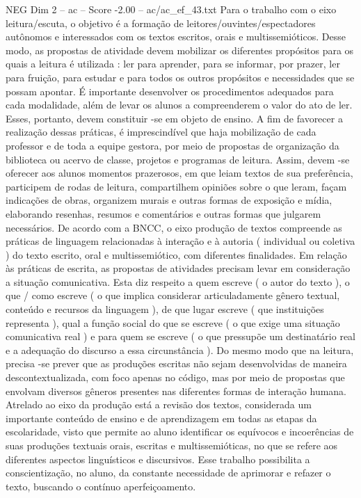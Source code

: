 \begin{textsample}{NEG Dim 2 – ac – Score -2.00 – ac/ac\_ef\_43.txt}
Para o trabalho com o eixo leitura/escuta, o objetivo é a formação de leitores/ouvintes/espectadores autônomos e interessados com os textos escritos, orais e multissemióticos.
Desse modo, as propostas de atividade devem mobilizar os diferentes propósitos para os quais a leitura é utilizada : ler para aprender, para se informar, por prazer, ler para fruição, para estudar e para todos os outros propósitos e necessidades que se possam apontar.
É importante desenvolver os procedimentos adequados para cada modalidade, além de levar os alunos a compreenderem o valor do ato de ler.
Esses, portanto, devem constituir -se em objeto de ensino.
A fim de favorecer a realização dessas práticas, é imprescindível que haja mobilização de cada professor e de toda a equipe gestora, por meio de propostas de organização da biblioteca ou acervo de classe, projetos e programas de leitura.
Assim, devem -se oferecer aos alunos momentos prazerosos, em que leiam textos de sua preferência, participem de rodas de leitura, compartilhem opiniões sobre o que leram, façam indicações de obras, organizem murais e outras formas de exposição e mídia, elaborando resenhas, resumos e comentários e outras formas que julgarem necessários.
De acordo com a BNCC, o eixo produção de textos compreende as práticas de linguagem relacionadas à interação e à autoria ( individual ou coletiva ) do texto escrito, oral e multissemiótico, com diferentes finalidades.
Em relação às práticas de escrita, as propostas de atividades precisam levar em consideração a situação comunicativa.
Esta diz respeito a quem escreve ( o autor do texto ), o que / como escreve ( o que implica considerar articuladamente gênero textual, conteúdo e recursos da linguagem ), de que lugar escreve ( que instituições representa ), qual a função social do que se escreve ( o que exige uma situação comunicativa real ) e para quem se escreve ( o que pressupõe um destinatário real e a adequação do discurso a essa circunstância ).
Do mesmo modo que na leitura, precisa -se prever que as produções escritas não sejam desenvolvidas de maneira descontextualizada, com foco apenas no código, mas por meio de propostas que envolvam diversos gêneros presentes nas diferentes formas de interação humana.
Atrelado ao eixo da produção está a revisão dos textos, considerada um importante conteúdo de ensino e de aprendizagem em todas as etapas da escolaridade, visto que permite ao aluno identificar os equívocos e incoerências de suas produções textuais orais, escritas e multissemióticas, no que se refere aos diferentes aspectos linguísticos e discursivos.
Esse trabalho possibilita a conscientização, no aluno, da constante necessidade de aprimorar e refazer o texto, buscando o contínuo aperfeiçoamento.

\end{textsample}
